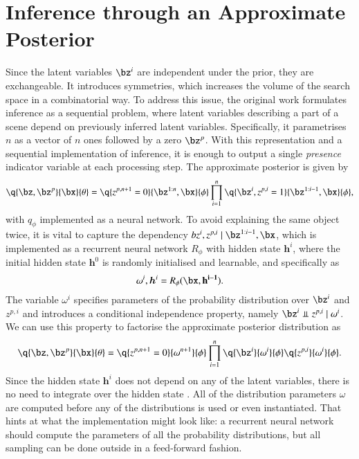 \documentclass[]{article}
\begin{document}
\section{Inference through an Approximate Posterior}
    
    Since the latent variables $\bz^i$ are independent under the prior, they are exchangeable. It introduces symmetries, which increases the volume of the search space in a combinatorial way. To address this issue, the original work formulates inference as a sequential problem, where latent variables describing a part of a scene depend on previously inferred latent variables. Specifically, it parametrises $n$ as a vector of $n$ ones followed by a zero $\bz^p$. With this representation and a sequential implementation of inference, it is enough to output a single \emph{presence} indicator variable at each processing step. The approximate posterior is given by
    \begin{equation}
        \q{\bz, \bz^p}{\bx}{\theta} = \q{z^{p, n+1} = 0}{\bz^{1:n}, \bx}{\phi} \prod_{i=1}^n \q{\bz^i, z^{p, i} = 1}{\bz^{1:i-1}, \bx}{\phi},
    \end{equation}
    with $q_\phi$ implemented as a neural network. To avoid explaining the same object twice, it is vital to capture the dependency $bz^i, z^{p, i} \mid \bz^{1:i-1}, \bx$, which is implemented as a recurrent neural network $R_\phi$ with hidden state $\bm{h}^i$, where the initial hidden state $\bm{h}^0$ is randomly initialised and learnable, and specifically as
    \begin{equation}
        \omega^i, \bm{h}^i = R_\phi (\bx, \bf{h}^{i-1}).
    \end{equation}
    The variable $\omega^i$ specifies parameters of the probability distribution over $\bz^i$ and $z^{p, i}$ and introduces a conditional independence property, namely $\bz^i \Perp z^{p, i} \mid \omega^i$. We can use this property to factorise the approximate posterior distribution as
    \begin{equation}
          \q{\bz, \bz^p}{\bx}{\theta} = \q{z^{p, n+1} = 0}{\omega^{n+1}}{\phi} \prod_{i=1}^n \q{\bz^i}{\omega^i}{\phi} \q{z^{p, i}}{\omega^i}{\phi}.
    \end{equation}
    Since the hidden state $\bm{h}^i$ does not depend on any of the latent variables, there is no need to integrate over the hidden state . All of the distribution parameters $\omega$ are computed before any of the distributions is used or even instantiated. That hints at what the implementation might look like: a recurrent neural network should compute the parameters of all the probability distributions, but all sampling can be done outside in a feed-forward fashion.
    
\end{document}
